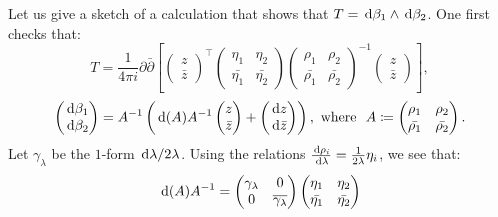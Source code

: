 \documentclass[a4paper,12pt]{article}
\theoremstyle{remark}
\begin{document}
\begin{remark}\label{Rmk:calculationforT}
	Let us give a sketch of a calculation that shows that $T= \,\mathrm d \beta_1 \wedge \,\mathrm d \beta_2$. One first checks that:
	\begin{equation}\label{Expr:Traw}
	T=\frac{1}{4\pi i}\partial \bar{\partial} \left[ \begin{pmatrix}
	z \\ \bar{z}
	\end{pmatrix}^\intercal
	\begin{pmatrix}
	\eta_1 & \eta_2 \\
	\bar{\eta_1} & \bar{\eta_2}
	\end{pmatrix}
	\begin{pmatrix}
	\rho_1 & \rho_2 \\
	\bar{\rho_1} & \bar{\rho_2}
	\end{pmatrix}^{-1}
	\begin{pmatrix}
	z \\ \bar{z}
	\end{pmatrix}
	\right],
	\end{equation}
	\begin{equation}\label{Beta}
	\begin{pmatrix}
	\,\mathrm d \beta_1 \\ \,\mathrm d \beta_2
	\end{pmatrix}=
	A^{-1}\left(\,\mathrm d(A)A^{-1}\begin{pmatrix}
	z \\ \bar{z}
	\end{pmatrix}+\begin{pmatrix}
	\,\mathrm d z \\ \,\mathrm d \bar{z}
	\end{pmatrix}\right),  \text{ where } \ A\coloneqq \begin{pmatrix}
	\rho_1 & \rho_2 \\
	\bar{\rho_1} & \bar{\rho_2}
	\end{pmatrix}.
	\end{equation}
	Let $\gamma_{\lambda}$ be the $1$-form $\,\mathrm d \lambda/2\lambda$. Using the relations $\frac{\,\mathrm d \rho_i}{\,\mathrm d \lambda}=\frac{1}{2\lambda} \eta_i$, we see that:
	\[
	\,\mathrm d (A)A^{-1}= \begin{pmatrix}
	\gamma_{\lambda} & 0 \\ 0 & \overline{\gamma_{\lambda}}
	\end{pmatrix}\begin{pmatrix}
	\eta_1 & \eta_2 \\
	\bar{\eta_1} & \bar{\eta_2}
	\end{pmatrix}
\]
\end{remark}
\end{document}
